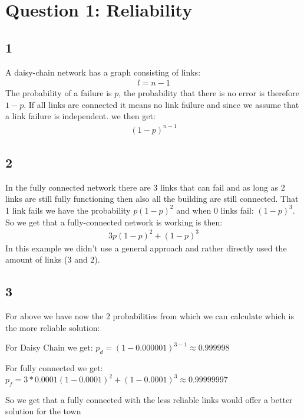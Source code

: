 \section{Question 1: Reliability}
\subsection{1}
A daisy-chain network has a graph consisting of links:
\begin{align}
l = n - 1 	
\end{align}
The probability of a failure is $p$, the probability that there is no error is therefore $1 - p$.
If all links are connected it means no link failure and since we assume that a link failure is independent. we then get:
\begin{align}
	(1-p)^{n-1}
\end{align}

\subsection{2}
In the fully connected network there are 3 links that can fail and as long as 2 links are still fully functioning then also all the building are still connected.
That 1 link fails we have the probability $p(1-p)^2$ and when 0 links fail: $(1-p)^3$.
So we get that a fully-connected network is working is then:
\begin{align}
	3p(1-p)^2+(1-p)^3
\end{align}
In this example we didn't use a general approach and rather directly used the amount of links (3 and 2).
\subsection{3}
For above we have now the 2 probabilities from which we can calculate which is the more reliable solution:

For Daisy Chain we get: $p_{d} = (1-0.000001)^{3-1} \approx 0.999998 $

For fully connected we get: $p_{f} = 3*0.0001(1-0.0001)^2+(1-0.0001)^3 \approx 0.99999997$

So we get that a fully connected with the less reliable links would offer a better solution for the town
